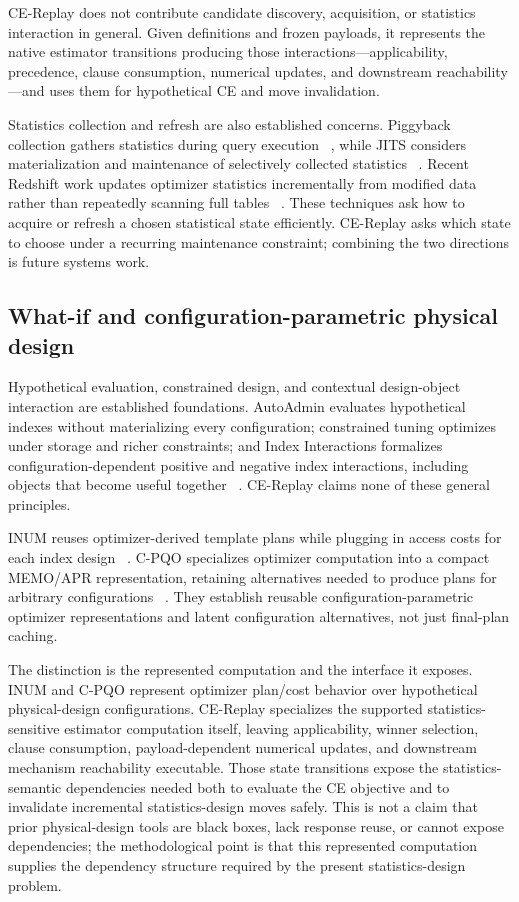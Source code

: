 \documentclass[sigconf,nonacm]{acmart}
\begin{document}
CE-Replay does not contribute candidate discovery, acquisition, or statistics interaction in general. Given definitions and frozen payloads, it represents the native estimator transitions producing those interactions---applicability, precedence, clause consumption, numerical updates, and downstream reachability---and uses them for hypothetical CE and move invalidation.

Statistics collection and refresh are also established concerns. Piggyback collection gathers statistics during query execution ~\cite{zhu2004piggyback}, while JITS considers materialization and maintenance of selectively collected statistics ~\cite{elhelw2007jits}. Recent Redshift work updates optimizer statistics incrementally from modified data rather than repeatedly scanning full tables ~\cite{pfeil2026redshift}. These techniques ask how to acquire or refresh a chosen statistical state efficiently. CE-Replay asks which state to choose under a recurring maintenance constraint; combining the two directions is future systems work.

\subsection{What-if and configuration-parametric physical design}

Hypothetical evaluation, constrained design, and contextual design-object interaction are established foundations. AutoAdmin evaluates hypothetical indexes without materializing every configuration; constrained tuning optimizes under storage and richer constraints; and Index Interactions formalizes configuration-dependent positive and negative index interactions, including objects that become useful together ~\cite{chaudhuri1998whatif,bruno2008constrained,schnaitter2009interactions}. CE-Replay claims none of these general principles.

INUM reuses optimizer-derived template plans while plugging in access costs for each index design ~\cite{papadomanolakis2007inum}. C-PQO specializes optimizer computation into a compact MEMO/APR representation, retaining alternatives needed to produce plans for arbitrary configurations ~\cite{bruno2008cpqo}. They establish reusable configuration-parametric optimizer representations and latent configuration alternatives, not just final-plan caching.

The distinction is the represented computation and the interface it exposes. INUM and C-PQO represent optimizer plan/cost behavior over hypothetical physical-design configurations. CE-Replay specializes the supported statistics-sensitive estimator computation itself, leaving applicability, winner selection, clause consumption, payload-dependent numerical updates, and downstream mechanism reachability executable. Those state transitions expose the statistics-semantic dependencies needed both to evaluate the CE objective and to invalidate incremental statistics-design moves safely. This is not a claim that prior physical-design tools are black boxes, lack response reuse, or cannot expose dependencies; the methodological point is that this represented computation supplies the dependency structure required by the present statistics-design problem.
\end{document}
